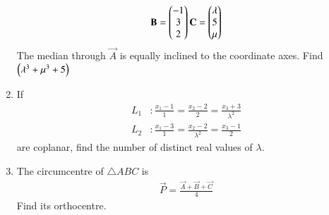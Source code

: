 \documentclass[journal,12pt,twocolumn]{IEEEtran}
\begin{document}
\begin{enumerate}[label=\arabic*.]
\begin{align}
\mathbf{B}=\begin{pmatrix}-1 \\ 3 \\ 2\end{pmatrix}
\mathbf{C}=\begin{pmatrix}\lambda \\ 5 \\ \mu\end{pmatrix}
\end{align}
%
The median through $\vec{A}$ is equally inclined to the coordinate axes.  Find $\left(\lambda^3+\mu^3+5\right)$
\item If
\begin{align}
L_1&:\frac{x_1-1}{1}=
\frac{x_2-2}{2} = 
\frac{x_3+3}{\lambda^2}
\\
L_2&:\frac{x_1-3}{1}=
\frac{x_2-2}{\lambda^2} = 
\frac{x_3-1}{2}
\end{align}
%
are coplanar, find the number of distinct real values of $\lambda$.
%
\item The circumcentre of $\triangle ABC$ is 
\begin{align}
\vec{P}=\frac{\vec{A}+\vec{B}+\vec{C}}{4}
\end{align}
%
Find its orthocentre.
\end{enumerate}
\end{document}
